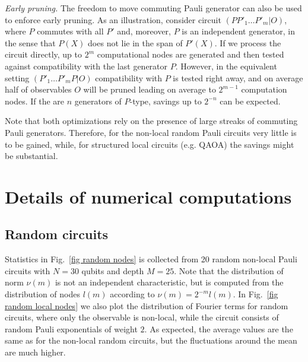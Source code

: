\documentclass[twocolumn, amsfonts, amssymb, aps, nofootinbib]{revtex4-2}
\begin{document}
\textit{Early pruning.} 
The freedom to move commuting Pauli generator can also be used to enforce early pruning. As an illustration, consider circuit $(P P'_1\dots P'_m|O)$, where $P$ commutes with all $P'$ and, moreover, $P$ is an independent generator, in the sense that $P(X)$ does not lie in the span of $P'(X)$. If we process the circuit directly, up to $2^m$ computational nodes are generated and then tested against compatibility with the last generator $P$. However, in the equivalent setting $(P'_1\dots P'_m P|O)$ compatibility with $P$ is tested right away, and on average half of observables $O$ will be pruned leading on average to $2^{m-1}$ computation nodes. If the are $n$ generators of $P$-type, savings up to $2^{-n}$ can be expected.

Note that both optimizations rely on the presence of large streaks of commuting Pauli generators. Therefore, for the non-local random Pauli circuits very little is to be gained, while, for structured local circuits (e.g. QAOA) the savings might be substantial.

\section{Details of numerical computations}
\subsection{Random circuits} \label{app random}
Statistics in Fig.~\ref{fig random nodes} is collected from 20 random non-local Pauli circuits with $N=30$ qubits and depth $M=25$. Note that the distribution of norm $\nu(m)$ is not an independent characteristic, but is computed from the distribution of nodes $l(m)$ according to $\nu(m)=2^{-m}l(m)$. In Fig.~\ref{fig random local nodes} we also plot the distribution of Fourier terms for random circuits, where only the observable is non-local, while the circuit consists of random Pauli exponentials of weight $2$. As expected, the average values are the same as for the non-local random circuits, but the fluctuations around the mean are much higher.
\end{document}
